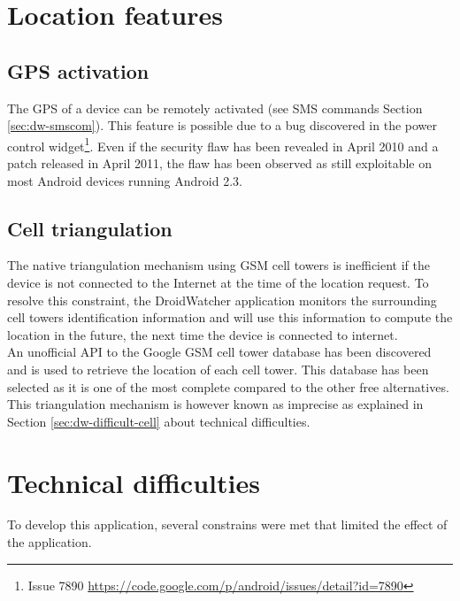 \section{Location features}

\subsection{GPS activation}

The GPS of a device can be remotely activated (see SMS commands Section \ref{sec:dw-smscom}).
This feature is possible due to a bug discovered in the power control widget\footnote{Issue 7890 \url{https://code.google.com/p/android/issues/detail?id=7890}}.
Even if the security flaw has been revealed in April 2010 and a patch released in April 2011, the flaw has been observed as still exploitable on most Android devices running Android 2.3.


\subsection{Cell triangulation}
The native triangulation mechanism using GSM cell towers is inefficient if the device is not connected to the Internet at the time of the location request.
To resolve this constraint, the DroidWatcher application monitors the surrounding cell towers identification information and will use this information to compute the location in the future, the next time the device is connected to internet.\\

An unofficial API to the Google GSM cell tower database has been discovered and is used to retrieve the location of each cell tower.
This database has been selected as it is one of the most complete compared to the other free alternatives.\\


This triangulation mechanism is however known as imprecise as explained in Section \ref{sec:dw-difficult-cell} about technical difficulties.

\section{Technical difficulties}

To develop this application, several constrains were met that limited the effect of the application.

